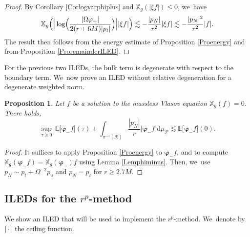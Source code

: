\documentclass[10pt]{amsart}
\theoremstyle{plain}
\newtheorem{proposition}{Proposition}[section]
\theoremstyle{definition}
\newcommand\T{{\mathbb{X}}}
\newcommand\dr{{\mathrm{d}}}
\begin{document}
\begin{proof}
By Corollary \ref{Corlogvarphiplus} and $\T_g(|\xi f|)\leq 0$, we~have
\[
\T_g \Bigl(\Big| \log \Bigl(\frac{|\Omega \varphi_+ |}{2(r+6M)|p_t|} \Bigr) \Big| |\xi f| \Bigr) \lesssim - \frac{|p_N|}{r^2} |\xi f| \lesssim -\frac{|p_N|^2}{r^2}|f|.
\]
The result then follows from the energy estimate of Proposition \ref{Proenergy} and from Proposition \ref{ProremainderILED}.
\end{proof}

For the previous two ILEDs, the bulk term is degenerate with respect to the boundary term. We~now prove an ILED without relative degeneration for a degenerate weighted norm.

\begin{proposition}\label{ProILED000}
Let $f $ be a solution to the massless Vlasov equation $\T_g(f)=0$. There holds,
\[
\sup_{\tau \geq 0} \,\mathbb{E} \bigl[ \pmb{\varphi}_- f \bigr](\tau) + \int_{\pi^{-1}(\mathcal{R})} \frac{|p_N|}{r} \big|\pmb{\varphi}_- f \big| \dr \mu_{\mathcal{P}} \lesssim \mathbb{E} \bigl[ \pmb{\varphi}_- f \bigr](0).
\]
\end{proposition}
\begin{proof}
It suffices to apply Proposition \ref{Proenergy} to $\pmb{\varphi}_- f$, and to compute $\T_g(\pmb{\varphi}_- f)=\T_g(\pmb{\varphi}_-)f$ using Lemma \ref{Lemphiminus}. Then, we~use $p_N \sim p_t+\Omega^{-2} p_u$ and $p_N=p_t$ for $r \geq 2.7M$.
\end{proof}

\subsection{ILEDs for the $r^p$-method}

We show an ILED that will be used to implement the $r^p$-method. We~denote by $\lceil \cdot \rceil$ the ceiling function.
\end{document}
